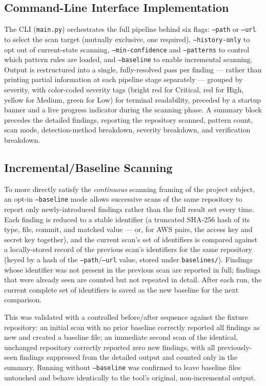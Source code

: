 \documentclass[12pt]{article}
\begin{document}
\subsection{Command-Line Interface Implementation}

The CLI (\texttt{main.py}) orchestrates the full pipeline behind six flags: \texttt{--path} or \texttt{--url} to select the scan target (mutually exclusive, one required), \texttt{--history-only} to opt out of current-state scanning, \texttt{--min-confidence} and \texttt{--patterns} to control which pattern rules are loaded, and \texttt{--baseline} to enable incremental scanning. Output is restructured into a single, fully-resolved pass per finding --- rather than printing partial information at each pipeline stage separately --- grouped by severity, with color-coded severity tags (bright red for Critical, red for High, yellow for Medium, green for Low) for terminal readability, preceded by a startup banner and a live progress indicator during the scanning phase. A summary block precedes the detailed findings, reporting the repository scanned, pattern count, scan mode, detection-method breakdown, severity breakdown, and verification breakdown.

\subsection{Incremental/Baseline Scanning}

To more directly satisfy the \emph{continuous} scanning framing of the project subject, an opt-in \texttt{--baseline} mode allows successive scans of the same repository to report only newly-introduced findings rather than the full result set every time. Each finding is reduced to a stable identifier (a truncated SHA-256 hash of its type, file, commit, and matched value --- or, for AWS pairs, the access key and secret key together), and the current scan's set of identifiers is compared against a locally-stored record of the previous scan's identifiers for the same repository (keyed by a hash of the \texttt{--path}/\texttt{--url} value, stored under \texttt{baselines/}). Findings whose identifier was not present in the previous scan are reported in full; findings that were already seen are counted but not repeated in detail. After each run, the current complete set of identifiers is saved as the new baseline for the next comparison.

This was validated with a controlled before/after sequence against the fixture repository: an initial scan with no prior baseline correctly reported all findings as new and created a baseline file; an immediate second scan of the identical, unchanged repository correctly reported zero new findings, with all previously-seen findings suppressed from the detailed output and counted only in the summary. Running without \texttt{--baseline} was confirmed to leave baseline files untouched and behave identically to the tool's original, non-incremental output.
\end{document}
